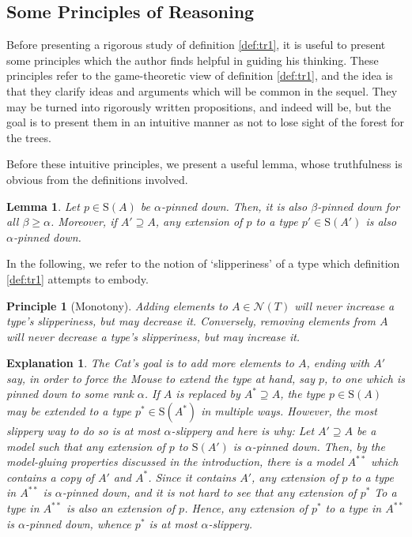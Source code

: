 \documentclass{article}
\newtheorem{lemma}[theorem]{Lemma}
\newtheorem{principle}{Principle}
\theoremstyle{nonumberplain}
\newtheorem{explanation}{Explanation}
\newcommand{\calN}{\mathcal{N}}
\newcommand{\Stone}{\mathrm{S}}
\begin{document}
\subsection{Some Principles of Reasoning}\label{sec:principles}

Before presenting a rigorous study of definition \ref{def:tr1}, it is useful to present some principles which the author finds helpful in guiding his thinking. These principles refer to the game-theoretic view of definition \ref{def:tr1}, and the idea is that they clarify ideas and arguments which will be common in the sequel. They may be turned into rigorously written propositions, and indeed will be, but the goal is to present them in an intuitive manner as not to lose sight of the forest for the trees.

Before these intuitive principles, we present a useful lemma, whose truthfulness is obvious from the definitions involved.

\begin{lemma}\label{lemma:pdmono}
Let $p \in \Stone(A)$ be $\alpha$-pinned down. Then, it is also $\beta$-pinned down for all $\beta \geq \alpha$. Moreover, if $A' \supseteq A$, any extension of $p$ to a type $p' \in \Stone(A')$ is also $\alpha$-pinned down.
\end{lemma}

In the following, we refer to the notion of `slipperiness' of a type which definition \ref{def:tr1} attempts to embody.

\begin{principle}[Monotony]\label{principle:mono}
Adding elements to $A \in \calN(T)$ will never increase a type's slipperiness, but may decrease it. Conversely, removing elements from $A$ will never decrease a type's slipperiness, but may increase it. 
\end{principle}

\begin{explanation}
The Cat's goal is to add more elements to $A$, ending with $A'$ say, in order to force the Mouse to extend the type at hand, say $p$, to one which is pinned down to some rank $\alpha$. If $A$ is replaced by $A^* \supseteq A$, the type $p \in \Stone(A)$ may be extended to a type $p^* \in \Stone(A^*)$ in multiple ways. However, the most slippery way to do so is at most $\alpha$-slippery and here is why: Let $A' \supseteq A$ be a model such that any extension of $p$ to $\Stone(A')$ is $\alpha$-pinned down. Then, by the model-gluing properties discussed in the introduction, there is a model $A^{**}$ which contains a copy of $A'$ and $A^*$. Since it contains $A'$, any extension of $p$ to a type in $A^{**}$ is $\alpha$-pinned down, and it is not hard to see that any extension of $p^*$ To a type in $A^{**}$ is also an extension of $p$. Hence, any extension of $p^*$ to a type in $A^{**}$ is $\alpha$-pinned down, whence $p^*$ is at most $\alpha$-slippery.
\end{explanation}
\end{document}
